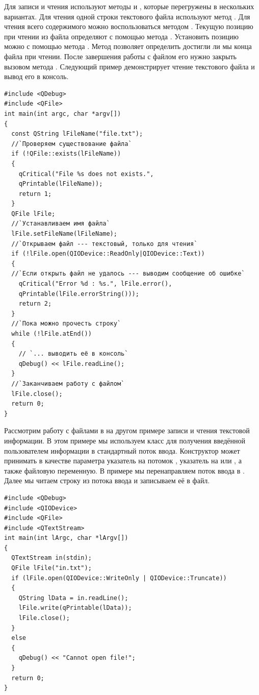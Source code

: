 Для записи и чтения используют методы
 и , которые перегружены в нескольких вариантах. Для
чтения одной строки текстового файла используют метод .
Для чтения всего содержимого можно воспользоваться методом . Текущую
позицию при чтении из файла определяют с помощью метода . Установить позицию можно с
помощью метода . Метод  позволяет определить достигли ли
мы конца файла при чтении. После завершения работы с файлом его нужно закрыть вызовом метода .
Следующий пример демонстрирует чтение текстового файла и вывод его в консоль.
\begin{lstlisting}
#include <QDebug>
#include <QFile>
int main(int argc, char *argv[])
{
  const QString lFileName("file.txt");
  //`Проверяем существование файла`
  if (!QFile::exists(lFileName))
  {
    qCritical("File %s does not exists.",
    qPrintable(lFileName));
    return 1;
  }
  QFile lFile;
  //`Устанавливаем имя файла`
  lFile.setFileName(lFileName);
  //`Открываем файл --- текстовый, только для чтения`
  if (!lFile.open(QIODevice::ReadOnly|QIODevice::Text))
  {
  //`Если открыть файл не удалось --- выводим сообщение об ошибке`
    qCritical("Error %d : %s.", lFile.error(),
    qPrintable(lFile.errorString()));
    return 2;
  }
  //`Пока можно прочесть строку`
  while (!lFile.atEnd())
  {
    // `... выводить её в консоль`
    qDebug() << lFile.readLine();
  }
  //`Заканчиваем работу с файлом`
  lFile.close();
  return 0;
}
\end{lstlisting}

Рассмотрим работу с файлами в  на другом примере
записи и чтения текстовой информации. В этом примере мы используем класс
 для получения введённой пользователем
информации в стандартный поток ввода. Конструктор  может принимать в качестве
параметра указатель на потомок , указатель на 
или , а также файловую переменную. В примере мы перенаправляем
поток ввода в . Далее мы читаем строку
из потока ввода и записываем её в файл.
\begin{lstlisting}
#include <QDebug>
#include <QIODevice>
#include <QFile>
#include <QTextStream>
int main(int lArgc, char *lArgv[])
{
  QTextStream in(stdin);
  QFile lFile("in.txt");
  if (lFile.open(QIODevice::WriteOnly | QIODevice::Truncate))
  {
    QString lData = in.readLine();
    lFile.write(qPrintable(lData));
    lFile.close();
  }
  else
  {
    qDebug() << "Cannot open file!";
  }
  return 0;
}
\end{lstlisting}

